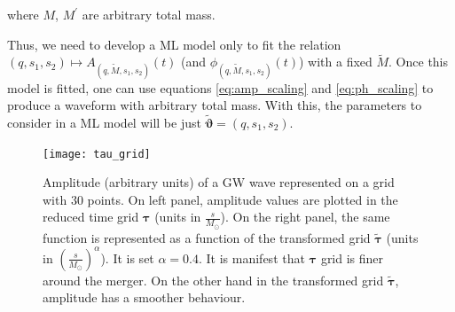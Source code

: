 where $M$, $M^\prime$ are arbitrary total mass.
\par
Thus, we need to develop a ML model only to fit the relation $(q, s_1, s_2) \longmapsto A_{(q, \tilde{M}, s_1, s_2)}(t)$ (and ${\phi}_{(q, \tilde{M}, s_1, s_2)}(t)$) with a fixed $\tilde{M}$.
Once this model is fitted, one can use equations \eqref{eq:amp_scaling} and \eqref{eq:ph_scaling} to produce a waveform with arbitrary total mass.
With this, the parameters to consider in a ML model will be just ${\tilde{\boldsymbol{\vartheta}} = (q, s_1, s_2)}$.
%
\begin{figure}[!t]
	\centering
	\texttt{[image: tau\_grid]}
	\caption{Amplitude (arbitrary units) of a GW wave represented on a grid with 30 points. On left panel, amplitude values are plotted in the reduced time grid $\boldsymbol{\tau}$ (units in $\frac{s}{M_\odot}$). On the right panel, the same function is represented as a function of the transformed grid $\boldsymbol{\tilde{\tau}}$ (units in $\left(\frac{s}{M_\odot}\right)^\alpha$).
It is set $\alpha = 0.4$.
It is manifest that $\boldsymbol{\tau}$ grid is finer around the merger. On the other hand in the transformed grid $\boldsymbol{\tilde{\tau}}$, amplitude has a smoother behaviour. 
}
	\label{fig:tau_grid}
\end{figure}
%
